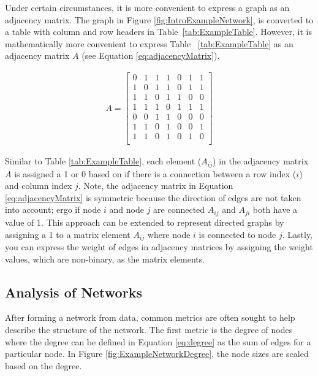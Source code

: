 Under certain circumstances, it is more convenient to express a graph as an adjacency matrix.  The graph in Figure \ref{fig:IntroExampleNetwork}, is converted to a table with column and row headers  in Table~\ref{tab:ExampleTable}. However, it is mathematically more convenient to express Table~ \ref{tab:ExampleTable} as an adjacency matrix $A$ (see Equation \ref{eq:adjacencyMatrix}).

\begin{gather}
A =
 \begin{bmatrix}
    0 & 1 & 1 & 1 & 0 & 1 & 1 \\
    1 & 0 & 1 & 1 & 0 & 1 & 1 \\
    1 & 1 & 0 & 1 & 1 & 0 & 0 \\
    1 & 1 & 1 & 0 & 1 & 1 & 1 \\
    0 & 0 & 1 & 1 & 0 & 0 & 0 \\ 
    1 & 1 & 0 & 1 & 0 & 0 & 1 \\ 
    1 & 1 & 0 & 1 & 0 & 1 & 0 \\
  \end{bmatrix}
  \label{eq:adjacencyMatrix}
\end{gather}

\noindent Similar to Table \ref{tab:ExampleTable}, each element (\(A_{ij}\)) in the adjacency matrix \(A\) is assigned a 1 or 0 based on if there is a connection between a row index (\(i\))  and column index \(j\). Note, the adjacency matrix in Equation \ref{eq:adjacencyMatrix} is symmetric because 
the direction of edges are not taken into account; ergo if node \(i\) and node \(j\) are connected \(A_{ij}\) and \(A_{ji}\) both have a value of 1. This approach can be extended to represent directed graphs by assigning a 1 to a matrix element \(A_{ij}\) where node \(i\) is connected to node \(j\). Lastly, you can express the weight of edges in adjacency matrices by assigning the weight values, which are non-binary, as the matrix elements.

\subsection{Analysis of Networks}
After forming a network from data, common metrics are often sought to help describe the structure of the network.  The first metric is the degree of nodes where the degree  can be defined in Equation \ref{eq:degree} as the sum of edges for a particular node. In Figure \ref{fig:ExampleNetworkDegree}, the node sizes are scaled based on the degree.

